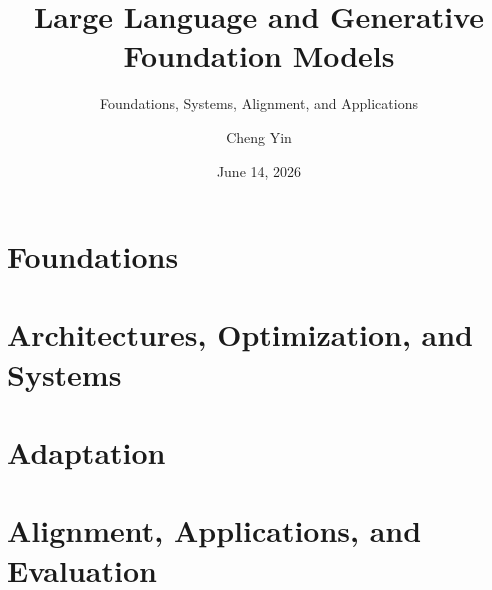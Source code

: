 \documentclass[graybox,envcountchap]{SNmono}
\begin{document}
\author{Cheng Yin}
\title{Large Language and Generative Foundation Models}
\subtitle{Foundations, Systems, Alignment, and Applications}
\date{June 14, 2026}
\maketitle

\frontmatter


\tableofcontents


\mainmatter

\part{Foundations}



\part{Architectures, Optimization, and Systems}







\part{Adaptation}




\part{Alignment, Applications, and Evaluation}







\appendix


\backmatter



\printindex
\end{document}
